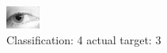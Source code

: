 \begin{figure}[h!]
\begin{center}
\includegraphics[width=0.60\columnwidth]{figures/ID1357_class_4_target_3.png}
\end{center}
\caption{ Classification: 4 actual target: 3}
\label{fig:ID1357_class_4_target_3}
\end{figure}
